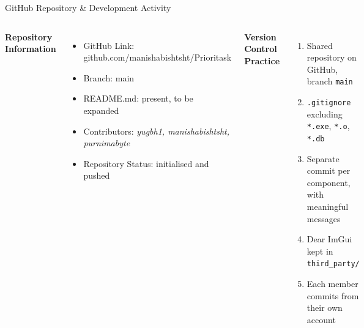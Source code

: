 \documentclass[aspectratio=169,11pt]{beamer}
\newcommand{\placeholder}[1]{%
\textit{\color{GEUGrey}#1}
}
\begin{document}
\begin{frame}{GitHub Repository \& Development Activity}

\begin{columns}[T,totalwidth=\textwidth]


\textbf{\color{GEUBlue}Repository Information}

\begin{itemize}\itemsep3pt
\scriptsize
\item GitHub Link: github.com/manishabishtsht/Prioritask
\item Branch: main
\item README.md: present, to be expanded
\item Contributors: \placeholder{yugbh1, manishabishtsht, purnimabyte}
\item Repository Status: initialised and pushed
\end{itemize}


\textbf{\color{GEUBlue}Version Control Practice}

\begin{enumerate}\itemsep3pt
\scriptsize
\item Shared repository on GitHub, branch \texttt{main}
\item \texttt{.gitignore} excluding \texttt{*.exe}, \texttt{*.o},
      \texttt{*.db}
\item Separate commit per component, with meaningful messages
\item Dear ImGui kept in \texttt{third\_party/}
\item Each member commits from their own account
\end{enumerate}

\end{columns}

\vfill



\end{frame}
\end{document}
